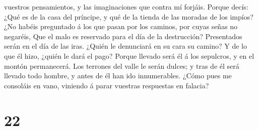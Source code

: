 vuestros pensamientos, y las imaginaciones que contra mí forjáis.
 Porque decís: ¿Qué es de la casa del príncipe, y qué de
la tienda de las moradas de los impíos?  ¿No habéis
preguntado á los que pasan por los caminos, por cuyas señas no negaréis,
 Que el malo es reservado para el día de la destrucción?
Presentados serán en el día de las iras.  ¿Quién le
denunciará en su cara su camino? Y de lo que él hizo, ¿quién le dará el
pago?  Porque llevado será él á los sepulcros, y en el
montón permanecerá.  Los terrones del valle le serán
dulces; y tras de él será llevado todo hombre, y antes de él han ido
innumerables.  ¿Cómo pues me consoláis en vano, viniendo
á parar vuestras respuestas en falacia?

\hypertarget{section-21}{%
\section{22}\label{section-21}}

